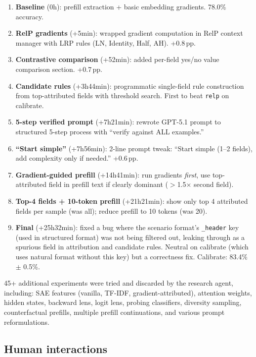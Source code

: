 \documentclass{article} %
\begin{document}
\begin{enumerate}[nosep]
    \item \textbf{Baseline} (0h): prefill extraction + basic embedding gradients. 78.0\% accuracy.
    \item \textbf{RelP gradients} (+5min): wrapped gradient computation in RelP context manager with LRP rules (LN, Identity, Half, AH). +0.8\,pp.
    \item \textbf{Contrastive comparison} (+52min): added per-field yes/no value comparison section. +0.7\,pp.
    \item \textbf{Candidate rules} (+3h44min): programmatic single-field rule construction from top-attributed fields with threshold search. First to beat \texttt{relp} on calibrate.
    \item \textbf{5-step verified prompt} (+7h21min): rewrote GPT-5.1 prompt to structured 5-step process with ``verify against ALL examples.''
    \item \textbf{``Start simple''} (+7h56min): 2-line prompt tweak: ``Start simple (1--2 fields), add complexity only if needed.'' +0.6\,pp.
    \item \textbf{Gradient-guided prefill} (+14h41min): run gradients \emph{first}, use top-attributed field in prefill text if clearly dominant ($>$1.5$\times$ second field).
    \item \textbf{Top-4 fields + 10-token prefill} (+21h21min): show only top 4 attributed fields per sample (was all); reduce prefill to 10 tokens (was 20).
    \item \textbf{Final} (+25h32min): fixed a bug where the scenario format's \texttt{\_header} key (used in structured format) was not being filtered out, leaking through as a spurious field in attribution and candidate rules. Neutral on calibrate (which uses natural format without this key) but a correctness fix. Calibrate: 83.4\% $\pm$ 0.5\%.
\end{enumerate}

45+ additional experiments were tried and discarded by the research agent, including: SAE features (vanilla, TF-IDF, gradient-attributed), attention weights, hidden states, backward lens, logit lens, probing classifiers, diversity sampling, counterfactual prefills, multiple prefill continuations, and various prompt reformulations.

\subsection{Human interactions}
\end{document}
